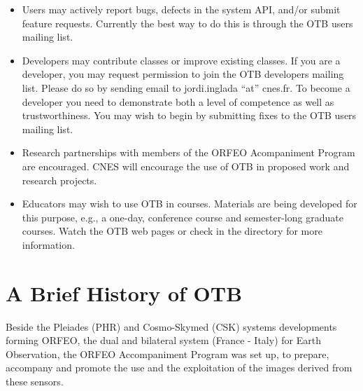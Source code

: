 \begin{itemize}
       \item Users may actively report bugs, defects in the system API,
       and/or submit feature requests. Currently the best way to do this is
       through the OTB users mailing list.

       \item Developers may contribute classes or improve existing
       classes. If you are a developer, you may request permission to join
       the OTB developers mailing list. Please do so by sending email to
       jordi.inglada ``at'' cnes.fr. To become a developer you need to
       demonstrate both a level of competence as well as
       trustworthiness. You may wish to begin by submitting fixes to the OTB
       users mailing list.

       \item Research partnerships with members of the ORFEO
       Acompaniment Program are encouraged. CNES will encourage the use of
       OTB in proposed work and research projects.


       \item Educators may wish to use OTB in courses. Materials are being
       developed for this purpose, e.g., a one-day, conference course and
       semester-long graduate courses. Watch the OTB web pages or check in
       the  directory for more information.
\end{itemize}

\section{A Brief History of OTB}
\label{sec:History}



Beside the Pleiades (PHR) and Cosmo-Skymed (CSK) systems developments forming ORFEO, the dual and bilateral system (France - Italy) for Earth Observation, the ORFEO Accompaniment Program was set up, to prepare, accompany and promote the use and the exploitation of the images derived from these sensors.

